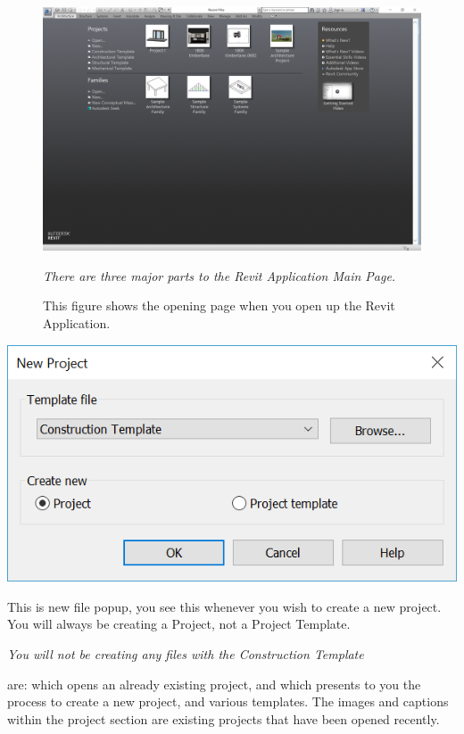 \documentclass{tufte-book} %
\begin{document}
\begin{figure}
	\includegraphics[width=\linewidth]{revitmainscene.PNG}
	\caption{This figure shows the opening page when you open up the Revit Application.}
	\emph{There are three major parts to the Revit Application Main Page.}
	\label{fig:revmainscene}
\end{figure}
\begin{marginfigure}
	\includegraphics[width=\linewidth]{revitnewfile.png}
	\caption{This is new file popup, you see this whenever you wish to create a new project. You will always be creating a Project, not a Project Template.}
	\emph{You will not be creating any files with the Construction Template}
	\label{fig:revnewfile}
\end{marginfigure}


 are:  which opens an already existing project, and  which presents to you the process to create a new project, and various templates. The images and captions within the project section are existing projects that have been opened recently.
\end{document}
